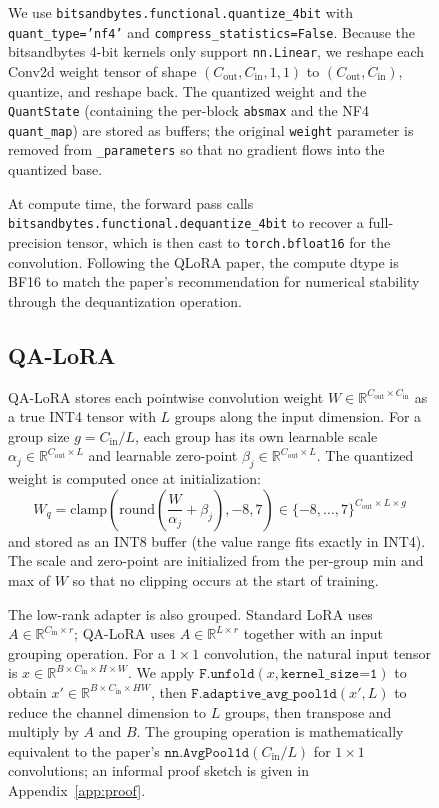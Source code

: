 \documentclass[conference]{IEEEtran}
\begin{document}
\begin{figure}[htbp]
We use \texttt{bitsandbytes.functional.quantize\_4bit} with \texttt{quant\_type='nf4'} and \texttt{compress\_statistics=False}. Because the bitsandbytes 4-bit kernels only support \texttt{nn.Linear}, we reshape each Conv2d weight tensor of shape $(C_{\text{out}}, C_{\text{in}}, 1, 1)$ to $(C_{\text{out}}, C_{\text{in}})$, quantize, and reshape back. The quantized weight and the \texttt{QuantState} (containing the per-block \texttt{absmax} and the NF4 \texttt{quant\_map}) are stored as buffers; the original \texttt{weight} parameter is removed from \texttt{\_parameters} so that no gradient flows into the quantized base.

At compute time, the forward pass calls \texttt{bitsandbytes.functional.dequantize\_4bit} to recover a full-precision tensor, which is then cast to \texttt{torch.bfloat16} for the convolution. Following the QLoRA paper, the compute dtype is BF16 to match the paper's recommendation for numerical stability through the dequantization operation.

\subsection{QA-LoRA}
QA-LoRA stores each pointwise convolution weight $W \in \mathbb{R}^{C_{\text{out}}\times C_{\text{in}}}$ as a true INT4 tensor with $L$ groups along the input dimension. For a group size $g = C_{\text{in}} / L$, each group has its own learnable scale $\alpha_j \in \mathbb{R}^{C_{\text{out}}\times L}$ and learnable zero-point $\beta_j \in \mathbb{R}^{C_{\text{out}}\times L}$. The quantized weight is computed once at initialization:
\begin{equation}
W_q = \mathrm{clamp}\left(\mathrm{round}\!\left(\frac{W}{\alpha_j} + \beta_j\right), -8, 7\right) \in \{-8,\dots,7\}^{C_{\text{out}}\times L\times g}
\end{equation}
and stored as an INT8 buffer (the value range fits exactly in INT4). The scale and zero-point are initialized from the per-group min and max of $W$ so that no clipping occurs at the start of training.

The low-rank adapter is also grouped. Standard LoRA uses $A \in \mathbb{R}^{C_{\text{in}}\times r}$; QA-LoRA uses $A \in \mathbb{R}^{L\times r}$ together with an input grouping operation. For a $1\times 1$ convolution, the natural input tensor is $x \in \mathbb{R}^{B\times C_{\text{in}}\times H\times W}$. We apply $\texttt{F.unfold}(x, \texttt{kernel\_size=1})$ to obtain $x' \in \mathbb{R}^{B\times C_{\text{in}}\times H W}$, then $\texttt{F.adaptive\_avg\_pool1d}(x', L)$ to reduce the channel dimension to $L$ groups, then transpose and multiply by $A$ and $B$. The grouping operation is mathematically equivalent to the paper's $\texttt{nn.AvgPool1d}(C_{\text{in}}/L)$ for $1\times 1$ convolutions; an informal proof sketch is given in Appendix~\ref{app:proof}.


\end{figure}
\end{document}
